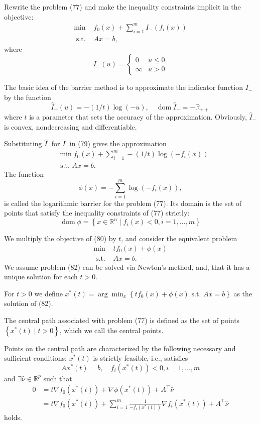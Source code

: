 \documentclass{article}
\begin{document}
Rewrite the problem (77) and make the inequality constraints implicit in the objective:
$$
\begin{array}{ll}
\min & f_0(x)+\sum_{i=1}^m I_{-}\left(f_i(x)\right) \\
\text { s.t. } & A x=b,
\end{array}
$$
where
$$
I_{-}(u)= \begin{cases}0 & u \leq 0 \\ \infty & u>0\end{cases}
$$

The basic idea of the barrier method is to approximate the indicator function $I_{-}$by the function
$$
\hat{I}_{-}(u)=-(1 / t) \log (-u), \quad \operatorname{dom} \hat{I}_{-}=-\mathbb{R}_{++}
$$
where $t$ is a parameter that sets the accuracy of the approximation.
Obviously, $\hat{I}_{-}$is convex, nondecreasing and differentiable.


Substituting $\hat{I}_{-}$for $I_{-}$in (79) gives the approximation
$$
\begin{aligned}
& \min f_0(x)+\sum_{i=1}^m-(1 / t) \log \left(-f_i(x)\right) \\
& \text { s.t. } A x=b .
\end{aligned}
$$
The function
$$
\phi(x)=-\sum_{i=1}^m \log \left(-f_i(x)\right),
$$
is called the logarithmic barrier for the problem (77). Its domain is the set of points that satisfy the inequality constraints of (77) strictly:
$$
\operatorname{dom} \phi=\left\{x \in \mathbb{R}^n \mid f_i(x)<0, i=1, \ldots, m\right\}
$$


We multiply the objective of (80) by $t$, and consider the equivalent problem
$$
\begin{array}{cl}
\min & t f_0(x)+\phi(x) \\
\text { s.t. } & A x=b .
\end{array}
$$
We assume problem (82) can be solved via Newton's method, and, that it has a unique solution for each $t>0$.

For $t>0$ we define $x^*(t)=\arg \min _x\left\{t f_0(x)+\phi(x)\right.$ s.t. $\left.A x=b\right\}$ as the solution of (82).

The central path associated with problem (77) is defined as the set of points $\left\{x^*(t) \mid t>0\right\}$, which we call the central points.

Points on the central path are characterized by the following necessary and sufficient conditions: $x^*(t)$ is strictly feasible, i.e., satisfies
$$
A x^*(t)=b, \quad f_i\left(x^*(t)\right)<0, i=1, \ldots, m
$$
and $\exists \hat{\nu} \in \mathbb{R}^p$ such that
$$
\begin{aligned}
0 & =t \nabla f_0\left(x^*(t)\right)+\nabla \phi\left(x^*(t)\right)+A^{\top} \hat{\nu} \\
& =t \nabla f_0\left(x^*(t)\right)+\sum_{i=1}^m \frac{1}{-f_i\left(x^*(t)\right)} \nabla f_i\left(x^*(t)\right)+A^{\top} \hat{\nu}
\end{aligned}
$$
holds.
\end{document}

